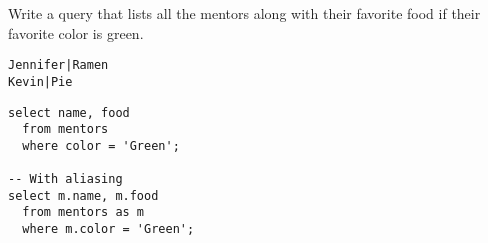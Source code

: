 \begin{blocksection}
\question Write a query that lists all the mentors along with their favorite food if their favorite color is green.

\begin{lstlisting}
Jennifer|Ramen
Kevin|Pie
\end{lstlisting}

\begin{solution}[1in]
\begin{lstlisting}
select name, food
  from mentors
  where color = 'Green';

-- With aliasing
select m.name, m.food
  from mentors as m
  where m.color = 'Green';
\end{lstlisting}
\end{solution}
\end{blocksection}
